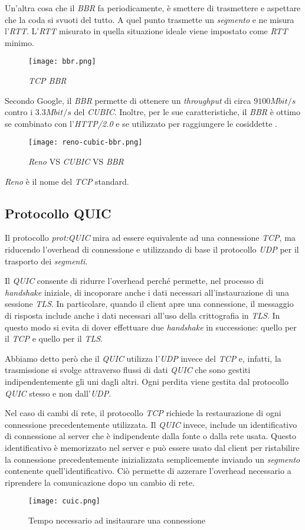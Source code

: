 Un'altra cosa che il \emph{BBR} fa periodicamente, è smettere di trasmettere
e aspettare che la coda si svuoti del tutto. A quel punto trasmette
un \emph{segmento} e ne misura l'\emph{RTT}. L'\emph{RTT} misurato in quella
situazione ideale viene impostato come \emph{RTT} minimo.

\begin{figure}[h!]
    \centering
    \texttt{[image: bbr.png]}
    \caption{\emph{TCP BBR}}
\end{figure}\noindent
Secondo Google, il \emph{BBR} permette di ottenere un \emph{throughput} di
circa $9100Mbit/s$ contro i $3.3Mbit/s$ del \emph{CUBIC}. Inoltre, per
le sue caratteristiche, il \emph{BBR} è ottimo se combinato con l'\emph{HTTP/2.0}
e se utilizzato per raggiungere le cosiddette .

\begin{figure}[t]
    \centering
    \texttt{[image: reno-cubic-bbr.png]}
    \caption{\emph{Reno} VS \emph{CUBIC} VS \emph{BBR}} 
\end{figure}
\begin{note}
    \emph{Reno} è il nome del \emph{TCP} standard.
\end{note}
\newpage
\subsection{Protocollo QUIC}
Il protocollo \emph{\gls{prot:QUIC}} mira ad essere equivalente ad una
connessione \emph{TCP}, ma riducendo l'overhead di connessione e utilizzando
di base il protocollo \emph{UDP} per il trasporto dei \emph{segmenti}.

Il \emph{QUIC} consente di ridurre l'overhead perché permette, nel processo
di \emph{handshake} iniziale, di incoporare anche i dati necessari
all'instaurazione di una sessione \emph{TLS}. In particolare, quando il
client apre una connessione, il messaggio di risposta include anche i dati
necessari all'uso della crittografia in \emph{TLS}. In questo modo si evita
di dover effettuare due \emph{handshake} in successione: quello per il
\emph{TCP} e quello per il \emph{TLS}.

Abbiamo detto però che il \emph{QUIC} utilizza l'\emph{UDP} invece del \emph{TCP}
e, infatti, la trasmissione si svolge attraverso flussi di dati \emph{QUIC} che
sono gestiti indipendentemente gli uni dagli altri. Ogni perdita viene gestita
dal protocollo \emph{QUIC} stesso e non dall'\emph{UDP}.

Nel caso di cambi di rete, il protocollo \emph{TCP} richiede la restaurazione
di ogni connessione precedentemente utilizzata. Il \emph{QUIC} invece, include un
identificativo di connessione al server che è indipendente dalla fonte o dalla
rete usata. Questo identificativo è memorizzato nel server e può essere usato
dal client per ristabilire la connessione precedentemente inizializzata
semplicemente inviando un \emph{segmento} contenente quell'identificativo.
Ciò permette di azzerare l'overhead necessario a riprendere la comunicazione
dopo un cambio di rete.

\begin{figure}[b]
    \centering
    \texttt{[image: cuic.png]}
    \caption{Tempo necessario ad insitaurare una connessione}
\end{figure}
